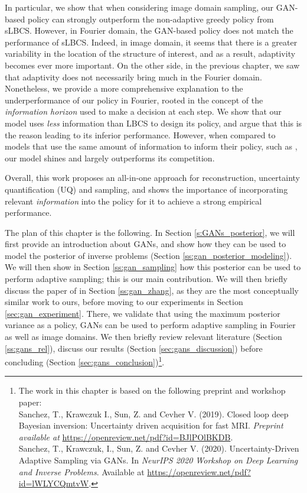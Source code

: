 In particular, we show that when considering image domain sampling, our GAN-based policy can strongly outperform the non-adaptive greedy policy from sLBCS. However, in Fourier domain, the GAN-based policy does not match the performance of sLBCS. Indeed, in image domain, it seems that there is a greater variability in the location of the structure of interest, and as a result, adaptivity becomes ever more important. On the other side, in the previous chapter, we saw that adaptivity does not necessarily bring much in the Fourier domain. Nonetheless, we provide a more comprehensive explanation to the underperformance of our policy in Fourier, rooted in the concept of the \textit{information horizon} used to make a decision at each step. We show that our model uses \textit{less} information than LBCS to design its policy, and argue that this is the reason leading to its inferior performance.
However, when compared to models that use the same amount of information to inform their policy, such as \citet{zhang2019reducing}, our model shines and largely outperforms its competition.

Overall, this work proposes an all-in-one approach for reconstruction, uncertainty quantification (UQ) and sampling, and shows the importance of incorporating relevant \textit{information} into the policy for it to achieve a strong empirical performance.

The plan of this chapter is the following. In Section \ref{s:GANs_posterior}, we will first provide an introduction about GANs, and show how they can be used to model the posterior of inverse problems (Section \ref{ss:gan_posterior_modeling}). We will then show in Section \ref{ss:gan_sampling} how this posterior can be used to perform adaptive sampling; this is our main contribution. We will then briefly discuss the paper of \citet{zhang2019reducing} in Section \ref{ss:gan_zhang}, as they are the most conceptually similar work to ours, before moving to our experiments in Section \ref{sec:gan_experiment}. There, we validate that using the maximum posterior variance as a policy, GANs can be used to perform adaptive sampling in Fourier as well as image domains. We then briefly review relevant literature (Section \ref{ss:gans_rel}), discuss our results (Section \ref{sec:gans_discussion}) before concluding (Section  \ref{sec:gans_conclusion})\footnote{The work in this chapter is based on the following preprint and workshop paper:\\
Sanchez, T., Krawczuk I., Sun, Z. and Cevher V. (2019). Closed loop deep Bayesian inversion: Uncertainty driven acquisition for fast MRI. \textit{Preprint available at} \url{https://openreview.net/pdf?id=BJlPOlBKDB}.\\
Sanchez, T., Krawczuk, I., Sun, Z. and Cevher V. (2020). Uncertainty-Driven Adaptive Sampling via GANs. In \textit{NeurIPS 2020 Workshop on Deep Learning and Inverse Problems}. Available at \url{https://openreview.net/pdf?id=lWLYCQmtvW}.}.

